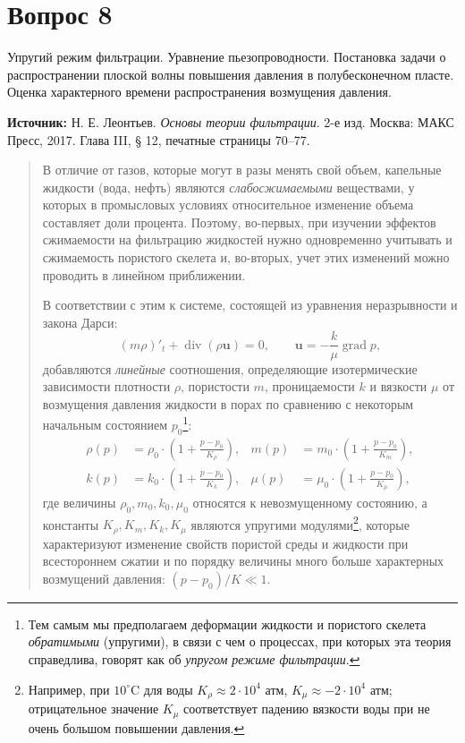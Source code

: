 \documentclass[12pt,a4paper]{article}
\DeclareMathOperator{\grad}{grad}
\DeclareMathOperator{\Div}{div}
\begin{document}
\section*{Вопрос 8}
\noindent Упругий режим фильтрации. Уравнение пьезопроводности. Постановка задачи о распространении плоской волны повышения давления в полубесконечном пласте. Оценка характерного времени распространения возмущения давления.

\medskip
\noindent\textbf{Источник:} Н. Е. Леонтьев. \textit{Основы теории фильтрации}. 2-е изд. Москва: МАКС Пресс, 2017. Глава III, § 12, печатные страницы 70--77.
\par\bigskip
\begin{quote}\sloppy
В отличие от газов, которые могут в разы менять свой объем, капельные жидкости (вода, нефть) являются \textit{слабосжимаемыми} веществами, у которых в промысловых условиях относительное изменение объема составляет доли процента. Поэтому, во-первых, при изучении эффектов сжимаемости на фильтрацию жидкостей нужно одновременно учитывать и сжимаемость пористого скелета и, во-вторых, учет этих изменений можно проводить в линейном приближении.

В соответствии с этим к системе, состоящей из уравнения неразрывности и закона Дарси:
\[
(m\rho)'_t+\Div(\rho\boldsymbol u)=0,\qquad \boldsymbol u=-\frac{k}{\mu}\grad p,
\]
добавляются \textit{линейные} соотношения, определяющие изотермические зависимости плотности $\rho$, пористости $m$, проницаемости $k$ и вязкости $\mu$ от возмущения давления жидкости в порах по сравнению с некоторым начальным состоянием $p_0$\footnote{Тем самым мы предполагаем деформации жидкости и пористого скелета \textit{обратимыми} (упругими), в связи с чем о процессах, при которых эта теория справедлива, говорят как об \textit{упругом режиме фильтрации}.}:
\begin{equation}\begin{aligned}
\rho(p)&=\rho_0\cdot\left(1+\frac{p-p_0}{K_\rho}\right),&m(p)&=m_0\cdot\left(1+\frac{p-p_0}{K_m}\right),\\
k(p)&=k_0\cdot\left(1+\frac{p-p_0}{K_k}\right),&\mu(p)&=\mu_0\cdot\left(1+\frac{p-p_0}{K_\mu}\right),
\end{aligned}\tag{12.1}\label{q8:eq-12-1}\end{equation}
где величины $\rho_0,m_0,k_0,\mu_0$ относятся к невозмущенному состоянию, а константы $K_\rho,K_m,K_k,K_\mu$ являются упругими модулями\footnote{Например, при $10^\circ$C для воды $K_\rho\approx2\cdot10^4$ атм, $K_\mu\approx-2\cdot10^4$ атм; отрицательное значение $K_\mu$ соответствует падению вязкости воды при не очень большом повышении давления.}, которые характеризуют изменение свойств пористой среды и жидкости при всестороннем сжатии и по порядку величины много больше характерных возмущений давления: $(p-p_0)/K\ll1$.

\setcounter{footnote}{0}
\par\nobreak{}\par
\end{quote}
\end{document}
